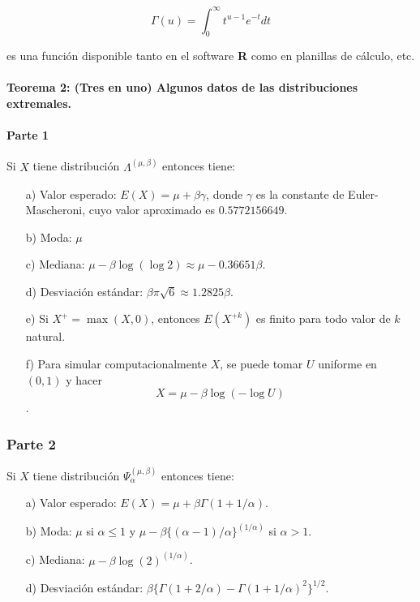 \documentclass[
  oneside]{book}
\begin{document}
\begin{equation}
\Gamma(u)=\int_0^{\infty}t^{u-1}e^{-t}dt
\end{equation}

es una función disponible tanto en el software \textbf{R} como en
planillas de cálculo, etc.

\hypertarget{teorema-2-tres-en-uno-algunos-datos-de-las-distribuciones-extremales.}{%
\paragraph{Teorema 2: (Tres en uno) Algunos datos de las distribuciones
extremales.}\label{teorema-2-tres-en-uno-algunos-datos-de-las-distribuciones-extremales.}}

\hypertarget{parte-1}{%
\paragraph{Parte 1}\label{parte-1}}

Si \(X\) tiene distribución \(\Lambda^{(\mu,\beta)}\) entonces tiene:

\begin{itemize}
  \item[a)] Valor esperado: $E(X) = \mu + \beta\gamma$, donde $\gamma$ es la constante de Euler-Mascheroni, cuyo valor aproximado es $0.5772156649$.
  \item[b)] Moda: $\mu$
  \item[c)] Mediana: $\mu - \beta \log(\log 2) \approx \mu - 0.36651 \beta$.
  \item[d)] Desviación estándar: $\beta \pi \sqrt{6} \approx 1.2825 \beta$.
  \item[e)] Si $X^+ = \max(X,0)$, entonces $E(X^{+k})$ es finito para todo valor de $k$ natural.
  \item[f)] Para simular computacionalmente $X$, se puede tomar $U$ uniforme en $(0,1)$ y hacer $$X = \mu - \beta \log(-\log U)$$.
\end{itemize}

\hypertarget{parte-2}{%
\subsubsection{Parte 2}\label{parte-2}}

Si \(X\) tiene distribución \(\Psi_{\alpha}^{(\mu,\beta)}\) entonces
tiene:

\begin{itemize}
  \item[a)] Valor esperado: $E(X) = \mu + \beta\Gamma(1+1/\alpha)$.
  \item[b)] Moda: $\mu$ si $\alpha\leq 1$ y $\mu-\beta\{(\alpha-1)/\alpha\}^{(1/\alpha)}$ si $\alpha>1$.
  \item[c)] Mediana: $\mu - \beta \log(2)^{(1/\alpha)}$.
  \item[d)] Desviación estándar: $\beta\{\Gamma(1+2/\alpha)-\Gamma(1+1/\alpha)^2\}^{1/2}$.
\end{itemize}
\end{document}
